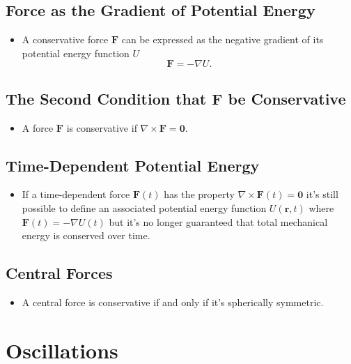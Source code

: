 \documentclass{article}
\renewcommand{\vec}[1]{\boldsymbol{\mathbf{#1}}}
\begin{document}
\subsection{Force as the Gradient of Potential Energy}

\begin{itemize}
  \item A conservative force $\vec{F}$ can be expressed as the negative gradient of its potential energy function $U$ \[\vec{F} = -\nabla U.\]
\end{itemize}

\subsection{The Second Condition that F be Conservative}

\begin{itemize}
  \item A force $\vec{F}$ is conservative if $\nabla \times \vec{F} = \vec{0}$.
\end{itemize}

\subsection{Time-Dependent Potential Energy}

\begin{itemize}
  \item If a time-dependent force $\vec{F}(t)$ has the property $\nabla \times \vec{F}(t) = \vec{0}$ it's still possible to define an associated potential energy function $U(\vec{r}, t)$ where $\vec{F}(t) = -\nabla U(t)$ but it's no longer guaranteed that total mechanical energy is conserved over time.
\end{itemize}

\setcounter{subsection}{7}
\subsection{Central Forces}

\begin{itemize}
  \item A central force is conservative if and only if it's spherically symmetric.
\end{itemize}

\section{Oscillations}
\end{document}
